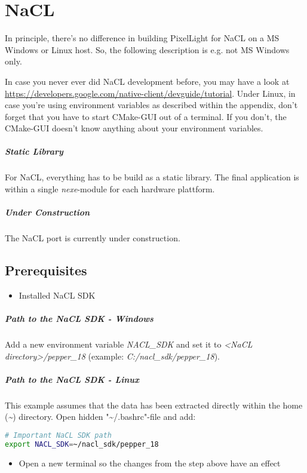 \chapter{NaCL}
In principle, there's no difference in building PixelLight for \ac{NaCL} on a \ac{MS} Windows or Linux host. So, the following description is e.g. not \ac{MS} Windows only.

In case you never ever did \ac{NaCL} development before, you may have a look at \url{https://developers.google.com/native-client/devguide/tutorial}. Under Linux, in case you're using environment variables as described within the appendix, don't forget that you have to start CMake-GUI out of a terminal. If you don't, the CMake-GUI doesn't know anything about your environment variables.


\paragraph{Static Library}
For \ac{NaCL}, everything has to be build as a static library. The final application is within a single \emph{nexe}-module for each hardware plattform.


\paragraph{Under Construction}
The \ac{NaCL} port is currently under construction.




\section{Prerequisites}
\begin{itemize}
\item{Installed \ac{NaCL} \ac{SDK}}
\end{itemize}


\paragraph{Path to the \ac{NaCL} \ac{SDK} - Windows}
Add a new environment variable \emph{NACL\_SDK} and set it to \emph{<NaCL directory>/pepper\_18} (example: \emph{C:/nacl\_sdk/pepper\_18}).


\paragraph{Path to the \ac{NaCL} \ac{SDK} - Linux}
This example assumes that the data has been extracted directly within the home (\emph{\textasciitilde}) directory. Open hidden "\textasciitilde /.bashrc"-file and add:
\begin{lstlisting}[language=sh]
# Important NaCL SDK path
export NACL_SDK=~/nacl_sdk/pepper_18
\end{lstlisting}
\begin{itemize}
\item{Open a new terminal so the changes from the step above have an effect}
\end{itemize}




